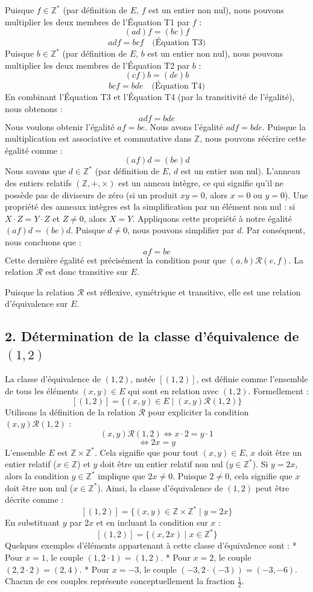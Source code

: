 \documentclass{report}
\begin{document}
Puisque $f \in \mathbb{Z}^*$ (par définition de $E$, $f$ est un entier non nul), nous pouvons multiplier les deux membres de l'Équation T1 par $f$ :
$$ (ad)f = (bc)f $$
$$ adf = bcf \quad \text{(Équation T3)} $$
Puisque $b \in \mathbb{Z}^*$ (par définition de $E$, $b$ est un entier non nul), nous pouvons multiplier les deux membres de l'Équation T2 par $b$ :
$$ (cf)b = (de)b $$
$$ bcf = bde \quad \text{(Équation T4)} $$
En combinant l'Équation T3 et l'Équation T4 (par la transitivité de l'égalité), nous obtenons :
$$ adf = bde $$
Nous voulons obtenir l'égalité $af = be$. Nous avons l'égalité $adf = bde$.
Puisque la multiplication est associative et commutative dans $\mathbb{Z}$, nous pouvons réécrire cette égalité comme :
$$ (af)d = (be)d $$
Nous savons que $d \in \mathbb{Z}^*$ (par définition de $E$, $d$ est un entier non nul).
L'anneau des entiers relatifs $(\mathbb{Z}, +, \times)$ est un anneau intègre, ce qui signifie qu'il ne possède pas de diviseurs de zéro (si un produit $xy=0$, alors $x=0$ ou $y=0$). Une propriété des anneaux intègres est la simplification par un élément non nul : si $X \cdot Z = Y \cdot Z$ et $Z \neq 0$, alors $X=Y$.
Appliquons cette propriété à notre égalité $(af)d = (be)d$. Puisque $d \neq 0$, nous pouvons simplifier par $d$.
Par conséquent, nous concluons que :
$$ af = be $$
Cette dernière égalité est précisément la condition pour que $(a,b) \mathcal{R} (e,f)$.
La relation $\mathcal{R}$ est donc transitive sur $E$.

Puisque la relation $\mathcal{R}$ est réflexive, symétrique et transitive, elle est une relation d'équivalence sur $E$.

\subsection*{2. Détermination de la classe d'équivalence de $(1,2)$}

La classe d'équivalence de $(1,2)$, notée $[(1,2)]$, est définie comme l'ensemble de tous les éléments $(x,y) \in E$ qui sont en relation avec $(1,2)$.
Formellement :
$$ [(1,2)] = \{ (x,y) \in E \mid (x,y) \mathcal{R} (1,2) \} $$
Utilisons la définition de la relation $\mathcal{R}$ pour expliciter la condition $(x,y) \mathcal{R} (1,2)$ :
$$ (x,y) \mathcal{R} (1,2) \iff x \cdot 2 = y \cdot 1 $$
$$ \iff 2x = y $$
L'ensemble $E$ est $\mathbb{Z} \times \mathbb{Z}^*$. Cela signifie que pour tout $(x,y) \in E$, $x$ doit être un entier relatif ($x \in \mathbb{Z}$) et $y$ doit être un entier relatif non nul ($y \in \mathbb{Z}^*$).
Si $y = 2x$, alors la condition $y \in \mathbb{Z}^*$ implique que $2x \neq 0$.
Puisque $2 \neq 0$, cela signifie que $x$ doit être non nul ($x \in \mathbb{Z}^*$).
Ainsi, la classe d'équivalence de $(1,2)$ peut être décrite comme :
$$ [(1,2)] = \{ (x,y) \in \mathbb{Z} \times \mathbb{Z}^* \mid y = 2x \} $$
En substituant $y$ par $2x$ et en incluant la condition sur $x$ :
$$ [(1,2)] = \{ (x, 2x) \mid x \in \mathbb{Z}^* \} $$
Quelques exemples d'éléments appartenant à cette classe d'équivalence sont :
*   Pour $x=1$, le couple $(1, 2 \cdot 1) = (1,2)$.
*   Pour $x=2$, le couple $(2, 2 \cdot 2) = (2,4)$.
*   Pour $x=-3$, le couple $(-3, 2 \cdot (-3)) = (-3,-6)$.
Chacun de ces couples représente conceptuellement la fraction $\frac{1}{2}$.
\end{document}
